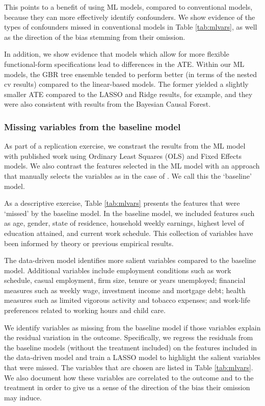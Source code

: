 \documentclass[12pt, a4paper]{article}
\begin{document}
This points to a benefit of using ML models, compared to conventional models, because they can more effectively identify confounders. We show evidence of the types of confounders missed in conventional models in Table \ref{tab:mlvars}, as well as the direction of the bias stemming from their omission. 

In addition, we show evidence that models which allow for more flexible functional-form specifications lead to differences in the ATE. Within our ML models, the GBR tree ensemble tended to perform better (in terms of the nested cv results) compared to the linear-based models. The former yielded a slightly smaller ATE compared to the LASSO and Ridge results, for example, and they were also consistent with results from the Bayesian Causal Forest.



\subsubsection{Missing variables from the baseline model}

As part of a replication exercise, we constrast the results from the ML model with published work using Ordinary Least Squares (OLS) and Fixed Effects models. We also contrast the features selected in the ML model with an approach that manually selects the variables as in the case of \cite{chesters2015}. We call this the `baseline' model.

As a descriptive exercise, Table \ref{tab:mlvars} presents the features that were `missed' by the baseline model. In the baseline model, we included features such as age, gender, state of residence, household weekly earnings, highest level of education attained, and current work schedule. This collection of variables have been informed by theory or previous empirical results.  

The data-driven model identifies more salient variables compared to the baseline model. Additional variables include employment conditions such as work schedule, casual employment, firm size, tenure or years unemployed; financial measures such as weekly wage, investment income and mortgage debt; health measures such as limited vigorous activity and tobacco expenses; and work-life preferences related to working hours and child care. 

We identify variables as missing from the baseline model if those variables explain the residual variation in the outcome. Specifically, we regress the residuals from the baseline models (without the treatment included) on the features included in the data-driven model and train a LASSO model to highlight the salient variables that were missed. The variables that are chosen are listed in Table \ref{tab:mlvars}. We also document how these variables are correlated to the outcome and to the treatment in order to give us a sense of the direction of the bias their omission may induce. 
\end{document}
